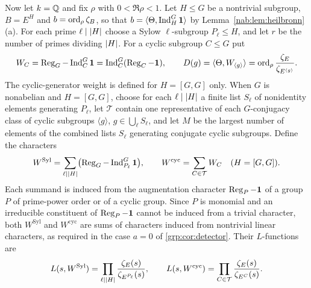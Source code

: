 Now let $k=\mathbb{Q}$ and fix $\rho$ with $0<\Re\rho<1$. Let $H\le G$ be a nontrivial subgroup,
$B=E^H$ and $b=\operatorname{ord}_\rho\zeta_B$, so that $b=\langle\Theta,\operatorname{Ind}_H^G\mathbf{1}\rangle$ by
Lemma~\ref{nab:lem:heilbronn}(a). For each prime $\ell\mid\lvert H\rvert$ choose a Sylow
$\ell$-subgroup $P_\ell\le H$, and let $r$ be the number of primes dividing $\lvert H\rvert$. For
a cyclic subgroup $C\le G$ put
\[
 W_C=\operatorname{Reg}_G-\operatorname{Ind}_C^G\mathbf{1}=\operatorname{Ind}_C^G(\operatorname{Reg}_C-\mathbf{1}),\qquad
 D(g)=\langle\Theta,W_{\langle g\rangle}\rangle=\operatorname{ord}_\rho\frac{\zeta_E}{\zeta_{E^{\langle g\rangle}}} .
\]
The cyclic-generator weight is defined for $H=[G,G]$ only. When $G$ is nonabelian and
$H=[G,G]$, choose for each $\ell\mid\lvert H\rvert$ a finite list $S_\ell$ of nonidentity elements
generating $P_\ell$, let $\mathcal T$ contain one representative of each $G$-conjugacy
class of cyclic subgroups $\langle g\rangle$, $g\in\bigcup_\ell S_\ell$, and let $M$ be the
largest number of elements of the combined lists $S_\ell$ generating conjugate cyclic
subgroups. Define the characters
\begin{equation}\label{nab:eq:weights-def}
 W^{\mathrm{Syl}}=\sum_{\ell\mid\lvert H\rvert}\bigl(\operatorname{Reg}_G-\operatorname{Ind}_{P_\ell}^G\mathbf{1}\bigr),
 \qquad
 W^{\mathrm{cyc}}=\sum_{C\in\mathcal T}W_C\quad(H=[G,G]).
\end{equation}
Each summand is induced from the augmentation character $\operatorname{Reg}_P-\mathbf{1}$ of a group $P$ of
prime-power order or of a cyclic group. Since $P$ is monomial and an irreducible
constituent of $\operatorname{Reg}_P-\mathbf{1}$ cannot be induced from a trivial character, both
$W^{\mathrm{Syl}}$ and $W^{\mathrm{cyc}}$ are sums of characters induced from nontrivial
linear characters, as required in the case $a=0$ of \cref{grp:cor:detector}. Their $L$-functions are
\[
 L(s,W^{\mathrm{Syl}})=\prod_{\ell\mid\lvert H\rvert}\frac{\zeta_E(s)}{\zeta_{E^{P_\ell}}(s)},
 \qquad
 L(s,W^{\mathrm{cyc}})=\prod_{C\in\mathcal T}\frac{\zeta_E(s)}{\zeta_{E^{C}}(s)} .
\]

